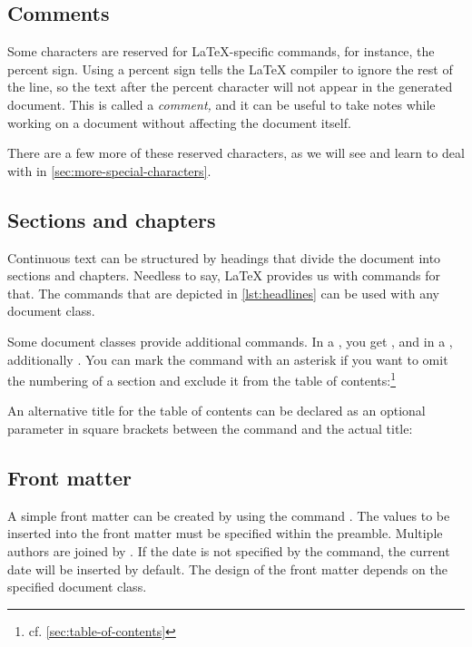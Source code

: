 \subsection{Comments}
Some characters are reserved for \LaTeX-specific commands, for instance, the percent sign. 
Using a percent sign tells the \LaTeX{} compiler to ignore the rest of the line, so the text after the percent character will not appear in the generated  document.
This is called a \emph{comment}\textit{,}
and it can be useful to take notes while working on a document without affecting the document itself. 

There are a few more of these reserved characters, as we will see and learn to deal with in \cref{sec:more-special-characters}.

\subsection{Sections and chapters}
Continuous text can be structured by headings that divide the document into sections and chapters. 
Needless to say, \LaTeX{} provides us with commands for that.
The commands that are depicted in \cref{lst:headlines} can be used with any document class. 


Some document classes provide additional commands. In a , you get , and in a , additionally .
You can mark the command with an asterisk if you want to omit the numbering of a section and exclude it from the table of contents:\footnote{cf. \cref{sec:table-of-contents}}


An alternative title for the table of contents can be declared as an optional 
parameter in square brackets between the command and the actual title:


\subsection{Front matter}
A simple front matter can be created by using the command . 
The values to be inserted into the front matter must be specified within the preamble. 
Multiple authors are joined by .
If the date is not specified by the  command, the current date will be inserted by default.
The design of the front matter depends on the specified document class.

